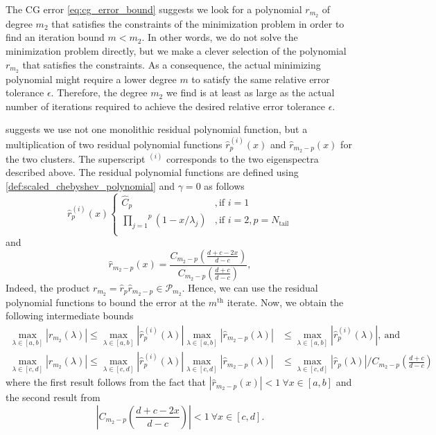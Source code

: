 The CG error \cref{eq:cg_error_bound} suggests we look for a polynomial $r_{m_2}$ of degree $m_2$ that satisfies the constraints of the minimization problem in order to find an iteration bound $m < m_2$. In other words, we do not solve the minimization problem directly, but we make a clever selection of the polynomial $r_{m_2}$ that satisfies the constraints. As a consequence, the actual minimizing polynomial might require a lower degree $m$ to satisfy the same relative error tolerance $\epsilon$. Therefore, the degree $m_2$ we find is at least as large as the actual number of iterations required to achieve the desired relative error tolerance $\epsilon$.

\citeauthor{cg_sharpened_convrate_Axelsson1976} suggests we use not one monolithic residual polynomial function, but a multiplication of two residual polynomial functions $\hat{r}^{(i)}_p(x)$ and $\hat{r}_{m_2-p}(x)$ for the two clusters. The superscript $^{(i)}$ corresponds to the two eigenspectra described above. The residual polynomial functions are defined using \cref{def:scaled_chebyshev_polynomial} and $\gamma = 0$ as follows
\begin{equation}
    \hat{r}^{(i)}_p (x)
    \begin{cases}
        \hat{C}_p                                            & , \text{if } i = 1                      \\
        \overset{p}{\underset{j=1}{\prod}} (1 - x/\lambda_j) & , \text{if } i = 2, p = N_{\text{tail}} \\
    \end{cases}
    \label{eq:residual_polynomial_rm}
\end{equation}
and
\begin{equation}
    \hat{r}_{{m_2}-p} (x) = \frac{C_{m_2-p} \left(\frac{d + c - 2x}{d - c}\right)}{C_{m_2-p}\left(\frac{d + c}{d - c}\right)},
    \label{eq:residual_polynomial_rpm}
\end{equation}
Indeed, the product $r_{m_2} = \hat{r}_p \hat{r}_{m_2-p} \in \mathcal{P}_{m_2}$. Hence, we can use the residual polynomial functions to bound the error at the $m^{\text{th}}$ iterate. Now, we obtain the following intermediate bounds
\begin{subequations}
    \begin{align}
        \max_{\lambda \in [a,b]} |r_{m_2}(\lambda)| \leq \max_{\lambda \in [a,b]} |\hat{r}^{(i)}_p(\lambda)| \max_{\lambda \in [a,b]} |\hat{r}_{m_2-p}(\lambda)| & \leq \max_{\lambda \in [a,b]} |\hat{r}^{(i)}_p(\lambda)|, \ \text{and} \label{eq:residual_polynomial_bound_ab}                     \\
        \max_{\lambda \in [c,d]} |r_{m_2}(\lambda)| \leq \max_{\lambda \in [c,d]} |\hat{r}^{(i)}_p(\lambda)| \max_{\lambda \in [c,d]} |\hat{r}_{m_2-p}(\lambda)| & \leq \max_{\lambda \in [c,d]} |\hat{r}_{p}(\lambda)|/C_{m_2-p}\left(\frac{d+c}{d-c}\right) \label{eq:residual_polynomial_bound_cd}
    \end{align}
\end{subequations}
where the first result follows from the fact that $|\hat{r}_{m_2-p}(x)| < 1 \ \forall x \in [a,b]$ and the second result from
\[
    \left|C_{m_2-p}\left(\frac{d+c -2x}{d-c}\right)\right| < 1 \ \forall x \in [c,d].
\]

